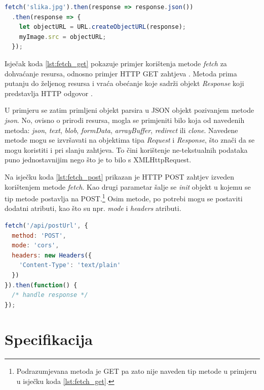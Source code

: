 \documentclass[times, utf8, zavrsni, numeric]{fer}
\newcommand{\razmakp}{\vspace{18pt}}
\newcommand{\razmaks}{\vspace{10pt}}
\begin{document}
\newpage

\razmakp
\begin{lstlisting}[language=JavaScript, caption={Primjer dohvata resursa s Fetch API}, label={lst:fetch_get}]
fetch('slika.jpg').then(response => response.json())
  .then(response => {
    let objectURL = URL.createObjectURL(response);
    myImage.src = objectURL;
  });
\end{lstlisting}
\razmaks

Isječak koda \ref{lst:fetch_get} pokazuje primjer korištenja metode \emph{fetch} za dohvaćanje resursa, odnosno primjer HTTP GET zahtjeva .
Metoda prima putanju do željenog resursa i vraća obećanje koje sadrži objekt \emph{Response} koji predstavlja HTTP odgovor .

U primjeru se zatim primljeni objekt parsira u JSON objekt pozivanjem metode \emph{json}.
No, ovisno o prirodi resursa, mogla se primjeniti bilo koja od navedenih metoda: \emph{json}, \emph{text}, \emph{blob}, \emph{formData}, \emph{arrayBuffer}, \emph{redirect} ili \emph{clone}\citep{fetch}.
Navedene metode mogu se izvršavati na objektima tipa \emph{Request} i \emph{Response}, što znači da se mogu koristiti i pri slanju zahtjeva.
To čini korištenje ne-tekstualnih podataka puno jednostavnijim nego što je to bilo s XMLHttpRequest.

\razmakp

Na isječku koda \ref{lst:fetch_post} prikazan je HTTP POST zahtjev  izveden korištenjem metode \emph{fetch}.
Kao drugi parametar šalje se \emph{init} objekt u kojemu se tip metode postavlja na POST.\footnote{Podrazumjevana metoda je GET pa zato nije naveden tip metode u primjeru u isječku koda \ref{lst:fetch_get}.}
Osim metode, po potrebi mogu se postaviti dodatni atributi, kao što su npr. \emph{mode} i \emph{headers} atributi.

\razmakp
\begin{lstlisting}[language=JavaScript, caption={Primjer slanja resursa s Fetch API}, label={lst:fetch_post}]
fetch('/api/postUrl', {
  method: 'POST', 
  mode: 'cors', 
  headers: new Headers({
    'Content-Type': 'text/plain'
  })
}).then(function() {
  /* handle response */
});
\end{lstlisting}
\razmaks



\chapter{Specifikacija}
\end{document}
